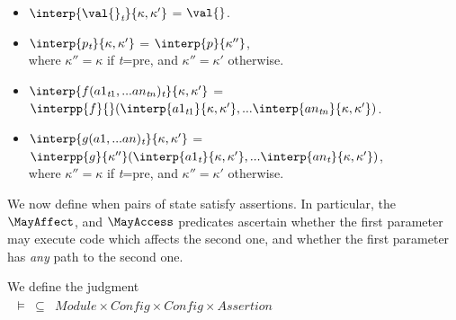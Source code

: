 {\begin{definition}[Interpretation]
\begin{itemize}
\item
 $
 \interp{\val{}_{{\textit{t}}}}{\kappa,\kappa'} $   = $ \val{}$.
 \item
  $\interp{p_{{\textit{t}}}}{\kappa,\kappa'}$ = $\interp{p{} }{\kappa''}$,\\
   where $\kappa''=\kappa$ if  {{\textit{t}}}=\textsf{pre}, and  $\kappa''=\kappa'$ otherwise.
  \item
  $\interp{f(a1_{{\textit{t}1}},...an_{{\textit{t}n}})_{{\textit{t}}}}{\kappa,\kappa'}$ =
  $\interpp{f}{}
  ( \interp{a1_{{\textit{t}1}}}{\kappa,\kappa'}, ...\interp{an_{{\textit{t}n}}}{\kappa,\kappa'})$.
  \item
  $\interp{g(a1,...an)_{{\textit{t}}}}{\kappa,\kappa'}$ =
  $\interpp{g}{\kappa''}
  ( \interp{a1_{{\textit{t}}}}{\kappa,\kappa'}, ...\interp{an_{{\textit{t}}}}{\kappa,\kappa'})$,\\
   where $\kappa''=\kappa$ if  {{\textit{t}}}=\textsf{pre}, and  $\kappa''=\kappa'$ otherwise.
 \end{itemize}
\end{definition}

We now define when pairs of state satisfy assertions. In particular, the $\MayAffect$, and
$\MayAccess$ predicates
 ascertain whether the first
parameter may execute code which affects the second one, and whether
the first parameter has {\em any} path to the second one.

\begin{definition}
We define the judgment \\
$
\begin{array}{c}
\begin{array}{lcl}
 \models  &   \subseteq &   Module \times Config \times Config \times Assertion
\end{array}
\end{array}
$


\end{definition}}
